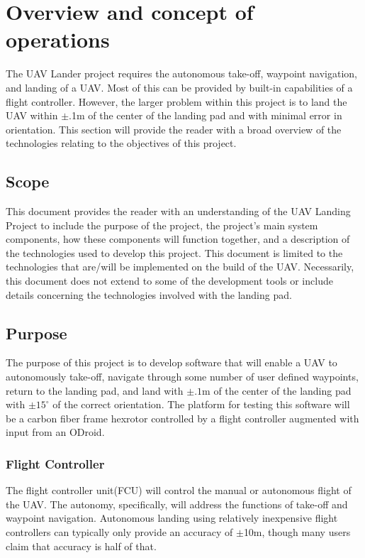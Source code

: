 \nocite{*}
\chapter{Overview and concept of operations}
The UAV Lander project requires the autonomous take-off, waypoint navigation, and landing of a UAV. Most of this can be provided by built-in capabilities of a flight controller. However, the larger problem within this project is to land the UAV within $\pm$.1m of the center of the landing pad and with minimal error in orientation. This section will provide the reader with a broad overview of the technologies relating to the objectives of this project.


\section{Scope}
This document provides the reader with an understanding of the UAV Landing Project to include the purpose of the project, the project's main system components, how these components will function together, and a description of the technologies used to develop this project. This document is limited to the technologies that are/will be implemented on the build of the UAV. Necessarily, this document does not extend to some of the development tools or include details concerning the technologies involved with the landing pad.  

\section{Purpose}
The purpose of this project is to develop software that will enable a UAV to autonomously take-off, navigate through some number of user defined waypoints, return to the landing pad, and land with $\pm .1$m of the center of the landing pad with $\pm 15^{\circ}$ of the correct orientation. The platform for testing this software will be a carbon fiber frame hexrotor controlled by a flight controller augmented with input from an ODroid.  

\subsection{Flight Controller}
The flight controller unit(FCU) will control the manual or autonomous flight of the UAV. The autonomy, specifically, will address the functions of take-off and waypoint navigation. Autonomous landing using relatively inexpensive flight controllers can typically only provide an accuracy of $\pm$10m, though many users claim that accuracy is half of that. \\

